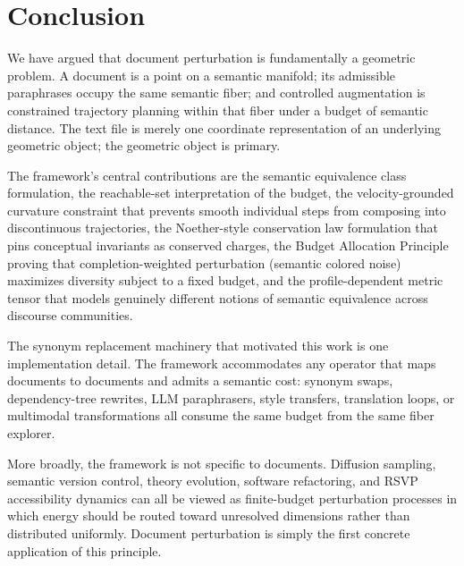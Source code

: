 \documentclass[12pt, a4paper]{article}
\theoremstyle{plain}
\theoremstyle{definition}
\theoremstyle{remark}
\begin{document}
\section{Conclusion}
\label{sec:conclusion}

We have argued that document perturbation is fundamentally a geometric problem.
A document is a point on a semantic manifold; its admissible paraphrases occupy
the same semantic fiber; and controlled augmentation is constrained trajectory
planning within that fiber under a budget of semantic distance.  The text file
is merely one coordinate representation of an underlying geometric object; the
geometric object is primary.

The framework's central contributions are the semantic equivalence class
formulation, the reachable-set interpretation of the budget, the velocity-grounded
curvature constraint that prevents smooth individual steps from composing into
discontinuous trajectories, the Noether-style conservation law formulation that
pins conceptual invariants as conserved charges, the Budget Allocation Principle
proving that completion-weighted perturbation (semantic colored noise) maximizes
diversity subject to a fixed budget, and the profile-dependent metric tensor that
models genuinely different notions of semantic equivalence across discourse
communities.

The synonym replacement machinery that motivated this work is one implementation
detail.  The framework accommodates any operator that maps documents to documents
and admits a semantic cost: synonym swaps, dependency-tree rewrites, LLM
paraphrasers, style transfers, translation loops, or multimodal transformations
all consume the same budget from the same fiber explorer.

More broadly, the framework is not specific to documents.  Diffusion sampling,
semantic version control, theory evolution, software refactoring, and RSVP
accessibility dynamics can all be viewed as finite-budget perturbation processes
in which energy should be routed toward unresolved dimensions rather than
distributed uniformly.  Document perturbation is simply the first concrete
application of this principle.

\newpage

\end{document}
